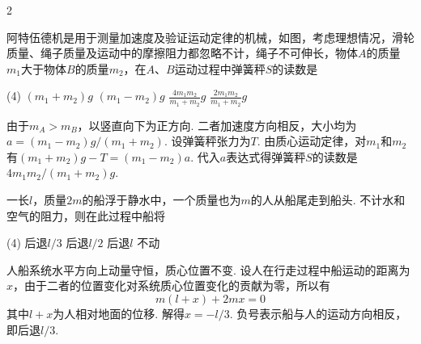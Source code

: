 \begin{paracol}{2}
\begin{problem}
    阿特伍德机是用于测量加速度及验证运动定律的机械，如图，考虑理想情况，滑轮质量、绳子质量及运动中的摩擦阻力都忽略不计，绳子不可伸长，物体$A$的质量$m_1$大于物体$B$的质量$m_2$，在$A$、$B$运动过程中弹簧秤$S$的读数是
    \begin{tasks}(4)
        \task $(m_1+m_2)g$
        \task $(m_1-m_2)g$
        \task[\true] $\frac{4m_1m_2}{m_1+m_2}g$
        \task $\frac{2m_1m_2}{m_1+m_2}g$
    \end{tasks}
    \switchcolumn\vspace*{\fill}\centering
    \vspace*{\fill}
\end{problem}
\end{paracol}
\begin{solution}
    由于$m_A>m_B$，以竖直向下为正方向. 二者加速度方向相反，大小均为$a=(m_1-m_2)g/(m_1+m_2)$. 设弹簧秤张力为$T$. 由质心运动定律，对$m_1$和$m_2$有$(m_1+m_2)g-T=(m_1-m_2)a$. 代入$a$表达式得弹簧秤$S$的读数是$4m_1m_2/(m_1+m_2)g$.
\end{solution}

\begin{problem}
    一长$l$，质量$2m$的船浮于静水中，一个质量也为$m$的人从船尾走到船头. 不计水和空气的阻力，则在此过程中船将
    \begin{tasks}(4)
        \task[\true] 后退$l/3$
        \task 后退$l/2$
        \task 后退$l$
        \task 不动
    \end{tasks}
\end{problem}
\begin{solution}
    人船系统水平方向上动量守恒，质心位置不变. 设人在行走过程中船运动的距离为$x$，由于二者的位置变化对系统质心位置变化的贡献为零，所以有
    \[m(l+x)+2mx=0\]
    其中$l+x$为人相对地面的位移. 解得$x=-l/3$. 负号表示船与人的运动方向相反，即后退$l/3$.
\end{solution}

